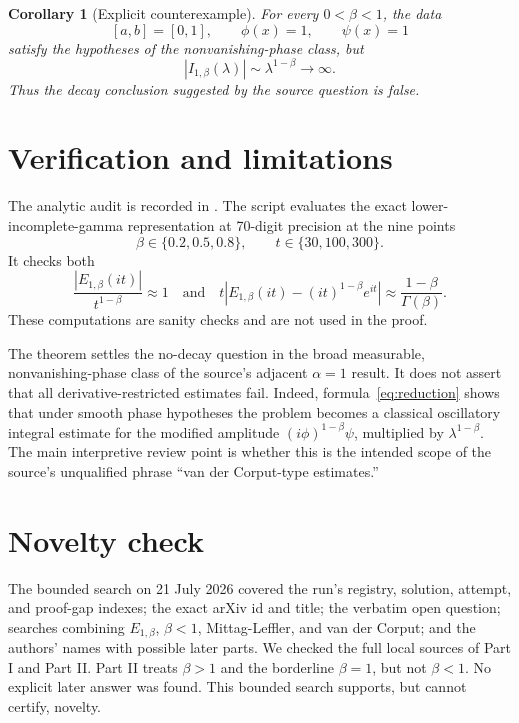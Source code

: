 \documentclass[11pt]{article}
\newtheorem{corollary}{Corollary}
\newcommand{\ML}[2]{E_{#1,#2}}
\begin{document}
\begin{corollary}[Explicit counterexample]
For every $0<\beta<1$, the data
\[
 [a,b]=[0,1],\qquad \phi(x)=1,\qquad \psi(x)=1
\]
satisfy the hypotheses of the nonvanishing-phase class, but
\[
 |I_{1,\beta}(\lambda)|\sim\lambda^{1-\beta}\longrightarrow\infty.
\]
Thus the decay conclusion suggested by the source question is false.
\end{corollary}

\section{Verification and limitations}

The analytic audit is recorded in . The script
 evaluates the exact
lower-incomplete-gamma representation at 70-digit precision at the nine
points
\[
 \beta\in\{0.2,0.5,0.8\},\qquad t\in\{30,100,300\}.
\]
It checks both
\[
 \frac{|\ML{1}{\beta}(it)|}{t^{1-\beta}}\approx1
 \quad\text{and}\quad
 t\left|\ML{1}{\beta}(it)-(it)^{1-\beta}e^{it}\right|
 \approx\frac{1-\beta}{\Gamma(\beta)}.
\]
These computations are sanity checks and are not used in the proof.

The theorem settles the no-decay question in the broad measurable,
nonvanishing-phase class of the source's adjacent $\alpha=1$ result. It does
not assert that all derivative-restricted estimates fail. Indeed,
formula~\eqref{eq:reduction} shows that under smooth phase hypotheses the
problem becomes a classical oscillatory integral estimate for the modified
amplitude $(i\phi)^{1-\beta}\psi$, multiplied by
$\lambda^{1-\beta}$. The main interpretive review point is whether this is
the intended scope of the source's unqualified phrase ``van der Corput-type
estimates.''

\section{Novelty check}

The bounded search on 21 July 2026 covered the run's registry, solution,
attempt, and proof-gap indexes; the exact arXiv id and title; the verbatim
open question; searches combining $\ML{1}{\beta}$, $\beta<1$, Mittag-Leffler,
and van der Corput; and the authors' names with possible later parts. We
checked the full local sources of Part I and Part II. Part II
\cite{PartII} treats $\beta>1$ and the borderline $\beta=1$, but not
$\beta<1$. No explicit later answer was found. This bounded search supports,
but cannot certify, novelty.
\end{document}
